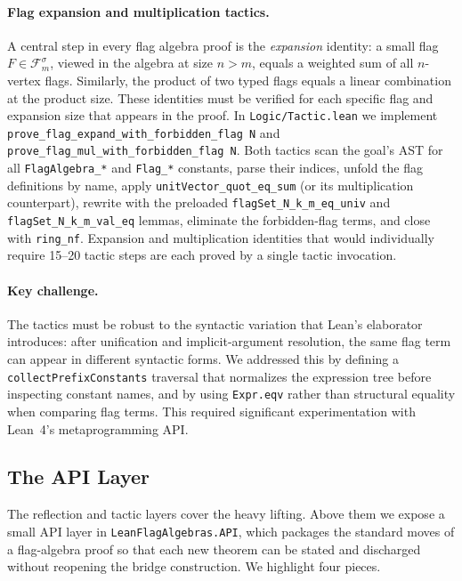 \documentclass{article}
\newcommand{\Flag}[1]{\mathcal{F}^{#1}}
\newcommand{\lean}[1]{\texttt{#1}}
\begin{document}
\paragraph{Flag expansion and multiplication tactics.}
A central step in every flag algebra proof is the \emph{expansion} identity:
a small flag $F \in \Flag{\sigma}_m$, viewed in the algebra at size $n > m$,
equals a weighted sum of all $n$-vertex flags.  Similarly, the product of
two typed flags equals a linear combination at the product size.  These
identities must be verified for each specific flag and expansion size that
appears in the proof.  In \lean{Logic/Tactic.lean} we implement
\lean{prove\_flag\_expand\_with\_forbidden\_flag N} and
\lean{prove\_flag\_mul\_with\_forbidden\_flag N}.  Both tactics scan the
goal's AST for all \lean{FlagAlgebra\_*} and \lean{Flag\_*} constants,
parse their indices, unfold the flag definitions by name, apply
\lean{unitVector\_quot\_eq\_sum} (or its multiplication counterpart), rewrite
with the preloaded \lean{flagSet\_N\_k\_m\_eq\_univ} and
\lean{flagSet\_N\_k\_m\_val\_eq} lemmas, eliminate the forbidden-flag terms,
and close with \lean{ring\_nf}.  Expansion and multiplication identities
that would individually require 15--20 tactic steps are each proved by a
single tactic invocation.

\paragraph{Key challenge.}
The tactics must be robust to the syntactic variation that Lean's elaborator
introduces: after unification and implicit-argument resolution, the same
flag term can appear in different syntactic forms.  We addressed this by
defining a \lean{collectPrefixConstants} traversal that normalizes the
expression tree before inspecting constant names, and by using
\lean{Expr.eqv} rather than structural equality when comparing flag terms.
This required significant experimentation with Lean~4's metaprogramming API.

\subsection{The API Layer}
\label{sec:api}

The reflection and tactic layers cover the heavy lifting.  Above them we
expose a small API layer in \lean{LeanFlagAlgebras.API}, which packages the
standard moves of a flag-algebra proof so that each new theorem can be stated
and discharged without reopening the bridge construction.  We highlight four
pieces.
\end{document}
